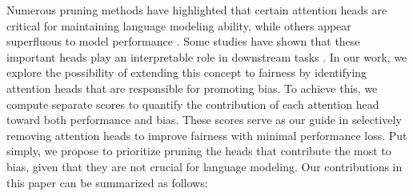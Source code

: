 \documentclass[letterpaper]{article} %
\begin{document}
Numerous pruning methods have highlighted that certain attention heads are critical for maintaining language modeling ability, while others appear superfluous to model performance \cite{voita-etal-2019-analyzing,NEURIPS2019_2c601ad9,he-choi-2021-stem,bian-etal-2021-attention,zhang-etal-2021-enlivening}. Some studies have shown that these important heads play an interpretable role in downstream tasks \cite{wang2022interpretability,voita-etal-2019-analyzing,he-choi-2021-stem}. %
In our work, we explore the possibility of extending this concept to fairness by identifying attention heads that are responsible for promoting bias. To achieve this, we compute separate scores to quantify the contribution of each attention head toward both
performance and bias. These scores serve as our guide in selectively removing attention heads to improve fairness with minimal performance loss. Put simply, we propose to prioritize pruning the heads that contribute the most to bias, %
given that they are not crucial for language modeling. %
Our contributions in this paper can be summarized as follows: 
\end{document}
